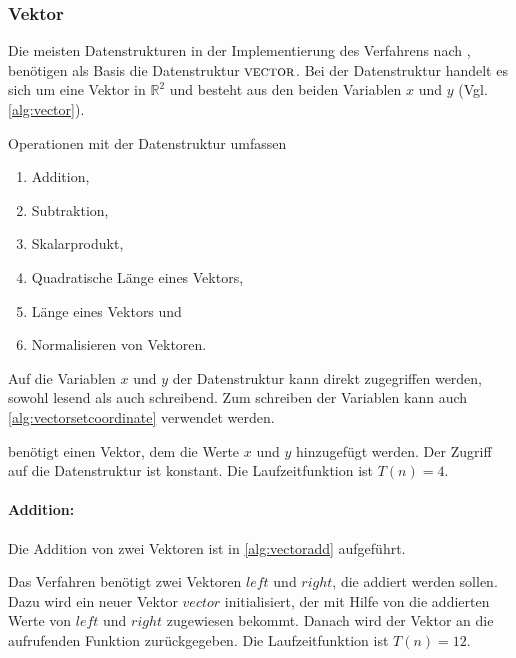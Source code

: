 \subsubsection{Vektor} %
\label{sub:vektor}

Die meisten Datenstrukturen in der Implementierung des Verfahrens nach \citeauthor{hirzer08}, benötigen als Basis die
 Datenstruktur $\textproc{vector}$. Bei der Datenstruktur handelt es sich um eine Vektor in $\mathbb{R}^2$ und besteht
 aus den beiden Variablen $x$ und $y$ (Vgl. \autoref{alg:vector}).

Operationen mit der Datenstruktur  umfassen

\begin{enumerate}
	\item Addition,
	\item Subtraktion,
	\item Skalarprodukt,
	\item Quadratische Länge eines Vektors,
	\item Länge eines Vektors und
	\item Normalisieren von Vektoren.
\end{enumerate}

Auf die Variablen $x$ und $y$ der Datenstruktur kann direkt zugegriffen werden, sowohl lesend als auch schreibend. Zum
 schreiben der Variablen kann auch \autoref{alg:vectorsetcoordinate} verwendet werden.

 benötigt einen Vektor, dem die Werte $x$ und $y$ hinzugefügt werden. Der Zugriff auf die
 Datenstruktur  ist konstant. Die Laufzeitfunktion ist $T(n) = 4$.

\paragraph{Addition:} %
\label{par:addition}

Die Addition von zwei Vektoren ist in \autoref{alg:vectoradd} aufgeführt.

Das Verfahren benötigt zwei Vektoren $\mathit{left}$ und $\mathit{right}$, die addiert werden sollen. Dazu wird ein
 neuer Vektor $\mathit{vector}$ initialisiert, der mit Hilfe von  die addierten Werte von
 $\mathit{left}$ und $\mathit{right}$ zugewiesen bekommt. Danach wird der Vektor an die aufrufenden Funktion
 zurückgegeben. Die Laufzeitfunktion ist $T(n) = 12$.

